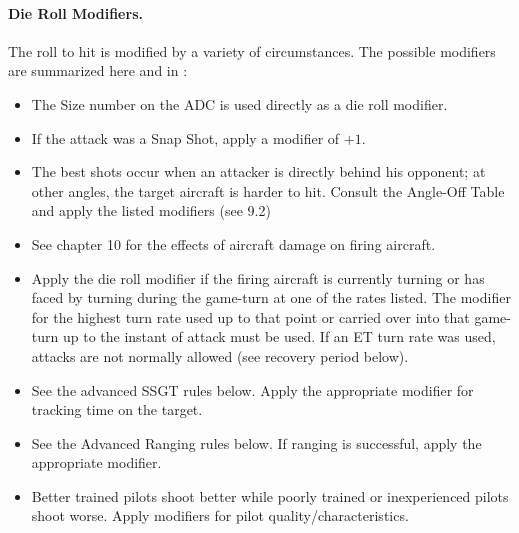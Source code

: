     
\paragraph{Die Roll Modifiers.} The roll to hit is modified by a variety of circumstances. The possible modifiers are summarized here and in :


\begin{itemize}

    \item{} The Size number on the ADC is used directly as a die roll modifier.

    \item{} If the attack was a Snap Shot, apply a modifier of $+1$.

    \item{} The best shots occur when an attacker is directly behind his opponent; at other angles, the target aircraft is harder to hit. Consult the Angle-Off Table and apply the listed modifiers (see 9.2)


    \item{} See chapter 10 for the effects of aircraft damage on firing aircraft.

    \item{} Apply the die roll modifier if the firing aircraft is currently turning or has faced by turning during the game-turn at one of the rates listed. The modifier for the highest turn rate used up to that point or carried over into that game-turn up to the instant of attack must be used. If an ET turn rate was used, attacks are not normally allowed (see recovery period below).

    \item{} See the advanced SSGT rules below. Apply the appropriate modifier for tracking time on the target.

    \item{} See the Advanced Ranging rules below. If ranging is successful, apply the appropriate modifier.

    \item{} Better trained pilots shoot better while poorly trained or inexperienced pilots shoot worse. Apply modifiers for pilot quality/characteristics.

\end{itemize}

